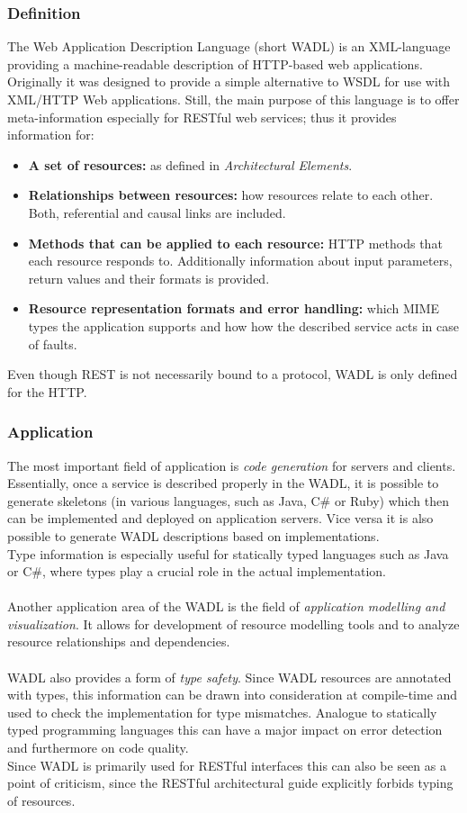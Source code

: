 \subsubsection*{Definition}
The Web Application Description Language (short WADL) is an XML-language providing a machine-readable description of HTTP-based  web applications. Originally it was designed to provide a simple alternative to WSDL for use with XML/HTTP Web applications. Still, the main purpose of this language is to offer meta-information especially for RESTful web services; thus it provides information for: 
\begin{itemize}
\item{{\bf A set of resources:} as defined in \emph{Architectural Elements}.}
\item{{\bf Relationships between resources:} how resources relate to each other. Both, referential and causal links are included.}
\item{{\bf Methods that can be applied to each resource:} HTTP methods that each resource responds to. Additionally information about input parameters, return values and their formats is provided.}
\item{{\bf Resource representation formats and error handling:} which MIME types the application supports and how how the described service acts in case of faults. \cite{WADL}}
\end{itemize}
Even though REST is not necessarily bound to a protocol, WADL is only defined for the HTTP.
\subsubsection*{Application}
The most important field of application is \emph{code generation} for servers and clients. Essentially, once a service is described properly in the WADL, it is possible to generate skeletons (in various languages, such as Java, C\# or Ruby) which then can be implemented and deployed on application servers. Vice versa it is also possible to generate WADL descriptions based on implementations.
\\
Type information is especially useful for statically typed languages such as Java or C\#, where types play a crucial role in the actual implementation.
\\ \\
Another application area of the WADL is the field of \emph{application modelling and visualization}. It allows for development of resource modelling tools and to analyze resource relationships and dependencies. \cite{WADL}
\\ \\
WADL also provides a form of \emph{type safety}. Since WADL resources are annotated with types, this information can be drawn into consideration at compile-time and used to check the implementation for type mismatches. Analogue to statically typed programming languages this can have a major impact on error detection and furthermore on code quality.
\\
Since WADL is primarily used for RESTful interfaces this can also be seen as a point of criticism, since the RESTful architectural guide explicitly forbids typing of resources.

